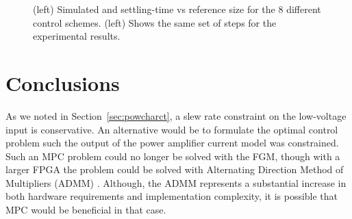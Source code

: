 \documentclass[journal,twocolumn,twoside]{IEEEtran}
\begin{document}
\begin{figure*}
  
  
  \caption{(left) Simulated and settling-time vs reference size for the 8 different control schemes. (left) Shows the same set of steps for the experimental results. }
  \label{fig:ts_vs_delr}
\end{figure*}



\section{Conclusions}


As we noted in Section~\ref{sec:powcharct}, a slew rate constraint on the low-voltage input is conservative. An alternative would be to formulate the optimal control problem such the output of the power amplifier current model was constrained. Such an MPC problem could no longer be solved with the FGM, though with a larger FPGA the problem could be solved with Alternating Direction Method of Multipliers (ADMM) \cite{Jerez_Trans_2014}. Although, the ADMM represents a substantial increase in both hardware requirements and implementation complexity, it is possible that MPC would be beneficial in that case. 
\end{document}
